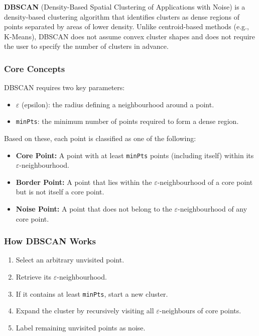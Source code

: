 \documentclass[9pt]{extarticle}
\begin{document}
\textbf{DBSCAN} (Density-Based Spatial Clustering of Applications with Noise) is a density-based clustering algorithm that identifies clusters as dense regions of points separated by areas of lower density. Unlike centroid-based methods (e.g., K-Means), DBSCAN does not assume convex cluster shapes and does not require the user to specify the number of clusters in advance.

\subsubsection{Core Concepts}

DBSCAN requires two key parameters:
\begin{itemize}
    \item $\varepsilon$ (epsilon): the radius defining a neighbourhood around a point.
    \item \texttt{minPts}: the minimum number of points required to form a dense region.
\end{itemize}

Based on these, each point is classified as one of the following:
\begin{itemize}
    \item \textbf{Core Point:} A point with at least \texttt{minPts} points (including itself) within its $\varepsilon$-neighbourhood.
    \item \textbf{Border Point:} A point that lies within the $\varepsilon$-neighbourhood of a core point but is not itself a core point.
    \item \textbf{Noise Point:} A point that does not belong to the $\varepsilon$-neighbourhood of any core point.
\end{itemize}

\subsubsection{How DBSCAN Works}

\begin{enumerate}
    \item Select an arbitrary unvisited point.
    \item Retrieve its $\varepsilon$-neighbourhood.
    \item If it contains at least \texttt{minPts}, start a new cluster.
    \item Expand the cluster by recursively visiting all $\varepsilon$-neighbours of core points.
    \item Label remaining unvisited points as noise.
\end{enumerate}
\end{document}
